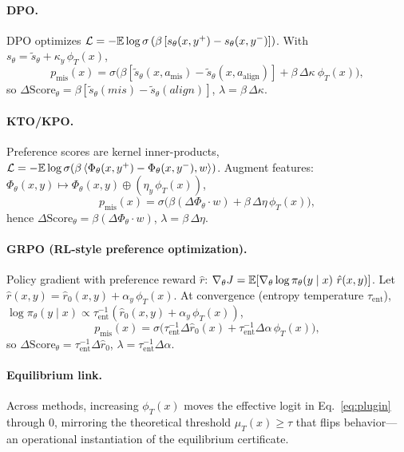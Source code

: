 \paragraph{DPO.}
DPO optimizes
$\mathcal L=-\mathbb{E}\log \sigma\left(\beta\,[s_\theta(x,y^+)-s_\theta(x,y^-)]\right)$.
With $s_\theta=\tilde s_\theta+\kappa_y\,\phi_T(x)$,
\[
p_{\text{mis}}(x)=\sigma\big(\beta[\tilde s_\theta(x,a_{\text{mis}})-\tilde s_\theta(x,a_{\text{align}})]
+\beta\,\Delta\kappa\ \phi_T(x)\big),
\]
so $\Delta \mathrm{Score}_\theta=\beta[\tilde s_\theta(mis)-\tilde s_\theta(align)]$, $\lambda=\beta\,\Delta\kappa$.

\paragraph{KTO/KPO.}
Preference scores are kernel inner-products,
$\mathcal L=-\mathbb{E}\log \sigma\!\left(\beta\,\langle \Phi_\theta(x,y^+)-\Phi_\theta(x,y^-),w\rangle\right)$.
Augment features: $\Phi_\theta(x,y)\mapsto \Phi_\theta(x,y)\oplus(\eta_y\,\phi_T(x))$,
\[
p_{\text{mis}}(x)=\sigma\big(\beta(\Delta\Phi_\theta\!\cdot\! w)+\beta\,\Delta\eta\,\phi_T(x)\big),
\]
hence $\Delta \mathrm{Score}_\theta=\beta(\Delta\Phi_\theta\!\cdot\! w)$, $\lambda=\beta\,\Delta\eta$.

\paragraph{GRPO (RL-style preference optimization).}
Policy gradient with preference reward $\hat r$:
$\nabla_\theta J=\mathbb{E}[\nabla_\theta\log\pi_\theta(y\mid x)\ \hat r(x,y)]$.
Let $\hat r(x,y)=\hat r_0(x,y)+\alpha_y\,\phi_T(x)$.
At convergence (entropy temperature $\tau_{\text{ent}}$),
$\log \pi_\theta(y\mid x)\propto \tau_{\text{ent}}^{-1}(\hat r_0(x,y)+\alpha_y\,\phi_T(x))$,
\[
p_{\text{mis}}(x)=\sigma\big(\tau_{\text{ent}}^{-1}\Delta \hat r_0(x)+\tau_{\text{ent}}^{-1}\Delta\alpha\,\phi_T(x)\big),
\]
so $\Delta \mathrm{Score}_\theta=\tau_{\text{ent}}^{-1}\Delta \hat r_0$, $\lambda=\tau_{\text{ent}}^{-1}\Delta\alpha$.

\paragraph{Equilibrium link.}
Across methods, increasing $\phi_T(x)$ moves the effective logit in Eq.~\ref{eq:plugin} through $0$, mirroring the theoretical threshold $\mu_T(x)\ge\tau$ that flips behavior---an operational instantiation of the equilibrium certificate.

\vspace{-0.25em}
